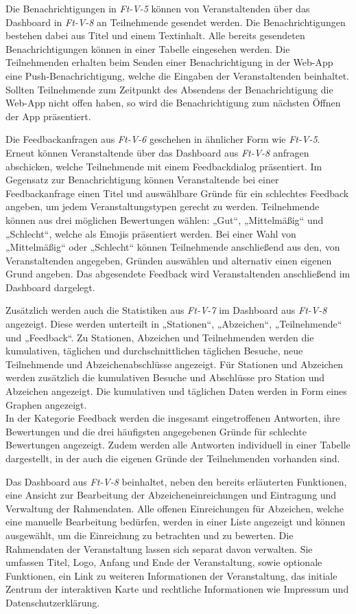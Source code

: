 Die Benachrichtigungen in \textit{Ft-V-5} können von Veranstaltenden über das
Dashboard in \textit{Ft-V-8} an Teilnehmende gesendet werden. Die
Benachrichtigungen bestehen dabei aus Titel und einem Textinhalt. Alle bereits
gesendeten Benachrichtigungen können in einer Tabelle eingesehen werden. Die
Teilnehmenden erhalten beim Senden einer Benachrichtigung in der Web-App eine
Push-Benachrichtigung, welche die Eingaben der Veranstaltenden beinhaltet.
Sollten Teilnehmende zum Zeitpunkt des Absendens der Benachrichtigung die
Web-App nicht offen haben, so wird die Benachrichtigung zum nächsten Öffnen der
App präsentiert.

Die Feedbackanfragen aus \textit{Ft-V-6} geschehen in ähnlicher Form wie
\textit{Ft-V-5}. Erneut können Veranstaltende über das Dashboard aus
\textit{Ft-V-8} anfragen abschicken, welche Teilnehmende mit einem
Feedbackdialog präsentiert. Im Gegensatz zur Benachrichtigung können
Veranstaltende bei einer Feedbackanfrage einen Titel und auswählbare Gründe für
ein schlechtes Feedback angeben, um jedem Veranstaltungstypen gerecht zu werden.
Teilnehmende können aus drei möglichen Bewertungen wählen: „Gut“, „Mittelmäßig“
und „Schlecht“, welche als Emojis präsentiert werden. Bei einer Wahl von
„Mittelmäßig“ oder „Schlecht“ können Teilnehmende anschließend aus den, von
Veranstaltenden angegeben, Gründen auswählen und alternativ einen eigenen Grund
angeben. Das abgesendete Feedback wird Veranstaltenden anschließend im Dashboard
dargelegt.

Zusätzlich werden auch die Statistiken aus \textit{Ft-V-7} im
Dashboard aus \textit{Ft-V-8} angezeigt. Diese werden unterteilt in „Stationen“,
„Abzeichen“, „Teilnehmende“ und „Feedback“. Zu Stationen, Abzeichen und
Teilnehmenden werden die kumulativen, täglichen und durchschnittlichen täglichen
Besuche, neue Teilnehmende und Abzeichenabschlüsse angezeigt. Für Stationen und
Abzeichen werden zusätzlich die kumulativen Besuche und Abschlüsse pro Station
und Abzeichen angezeigt. Die kumulativen und täglichen Daten werden in Form
eines Graphen angezeigt. \\
In der Kategorie Feedback werden die insgesamt eingetroffenen Antworten, ihre
Bewertungen und die drei häufigsten angegebenen Gründe für schlechte Bewertungen
angezeigt. Zudem werden alle Antworten individuell in einer Tabelle dargestellt,
in der auch die eigenen Gründe der Teilnehmenden vorhanden sind.

Das Dashboard aus \textit{Ft-V-8} beinhaltet, neben den bereits erläuterten
Funktionen, eine Ansicht zur Bearbeitung der Abzeicheneinreichungen und
Eintragung und Verwaltung der Rahmendaten. Alle offenen Einreichungen für
Abzeichen, welche eine manuelle Bearbeitung bedürfen, werden in einer Liste
angezeigt und können ausgewählt, um die Einreichung zu betrachten und zu
bewerten. Die Rahmendaten der Veranstaltung lassen sich separat davon verwalten.
Sie umfassen Titel, Logo, Anfang und Ende der Veranstaltung, sowie optionale
Funktionen, ein Link zu weiteren Informationen der Veranstaltung, das initiale
Zentrum der interaktiven Karte und rechtliche Informationen wie Impressum und
Datenschutzerklärung.

